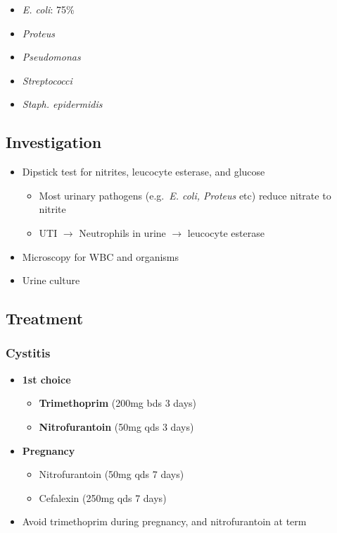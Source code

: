 \documentclass[
  12pt,
]{memoir}
\providecommand{\tightlist}{%
  \setlength{\itemsep}{0pt}\setlength{\parskip}{0pt}}
\begin{document}
\begin{itemize}
\tightlist
\item
  \emph{E. coli}: 75\%
\item
  \emph{Proteus}
\item
  \emph{Pseudomonas}
\item
  \emph{Streptococci}
\item
  \emph{Staph. epidermidis}
\end{itemize}

\hypertarget{investigation-27}{%
\subsection{Investigation}\label{investigation-27}}

\begin{itemize}
\tightlist
\item
  Dipstick test for nitrites, leucocyte esterase, and glucose

  \begin{itemize}
  \tightlist
  \item
    Most urinary pathogens (e.g.~\emph{E. coli, Proteus} etc) reduce
    nitrate to nitrite
  \item
    UTI \(\rightarrow\) Neutrophils in urine \(\rightarrow\) leucocyte
    esterase
  \end{itemize}
\item
  Microscopy for WBC and organisms
\item
  Urine culture
\end{itemize}

\hypertarget{treatment-17}{%
\subsection{Treatment}\label{treatment-17}}

\hypertarget{cystitis}{%
\subsubsection{Cystitis}\label{cystitis}}

\begin{itemize}
\tightlist
\item
  \textbf{1st choice}

  \begin{itemize}
  \tightlist
  \item
    \textbf{Trimethoprim} (200mg bds 3 days)
  \item
    \textbf{Nitrofurantoin} (50mg qds 3 days)
  \end{itemize}
\item
  \textbf{Pregnancy}

  \begin{itemize}
  \tightlist
  \item
    Nitrofurantoin (50mg qds 7 days)
  \item
    Cefalexin (250mg qds 7 days)
  \end{itemize}
\item
  Avoid trimethoprim during pregnancy, and nitrofurantoin at term
\end{itemize}
\end{document}
